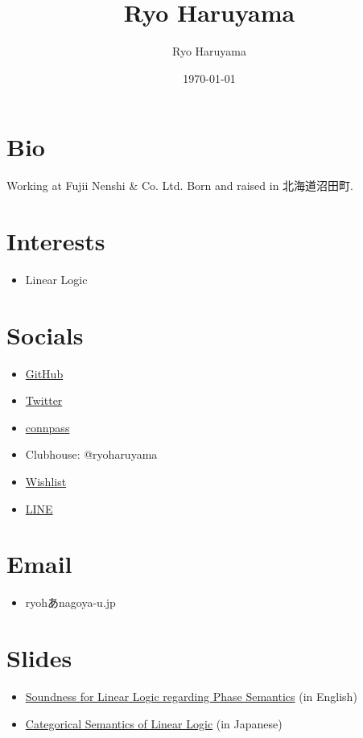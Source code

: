 \documentclass[11pt]{article}
\author{Ryo Haruyama}
\date{\today}
\title{Ryo Haruyama}
\begin{document}
\maketitle

\section*{Bio}
\label{sec:org8f50b3f}
Working at Fujii Nenshi \& Co. Ltd. Born and raised in 北海道沼田町.

\section*{Interests}
\label{sec:orgbb70fcd}
\begin{itemize}
\item Linear Logic
\end{itemize}

\section*{Socials}
\label{sec:orgc56523e}
\begin{itemize}
\item \href{https://github.com/rharuyama/}{GitHub}
\item \href{https://twitter.com/RyoHaruyama}{Twitter}
\item \href{https://connpass.com/user/Ryo\_Haruyama/}{connpass}
\item Clubhouse: @ryoharuyama
\item \href{https://www.amazon.co.jp/hz/wishlist/ls/3R1LX8E4SHIG6}{Wishlist}
\item \href{https://line.me/ti/p/CZo-uvtQ-p}{LINE}
\end{itemize}

\section*{Email}
\label{sec:org56856de}
\begin{itemize}
\item ryohあnagoya-u.jp
\end{itemize}

\section*{Slides}
\label{sec:orge91a688}
\begin{itemize}
\item \href{./phase-soundness.pdf}{Soundness for Linear Logic regarding Phase Semantics} (in English)
\item \href{./categorical-semantics-of-linear-logic.pdf}{Categorical Semantics of Linear Logic} (in Japanese)
\end{itemize}
\end{document}

